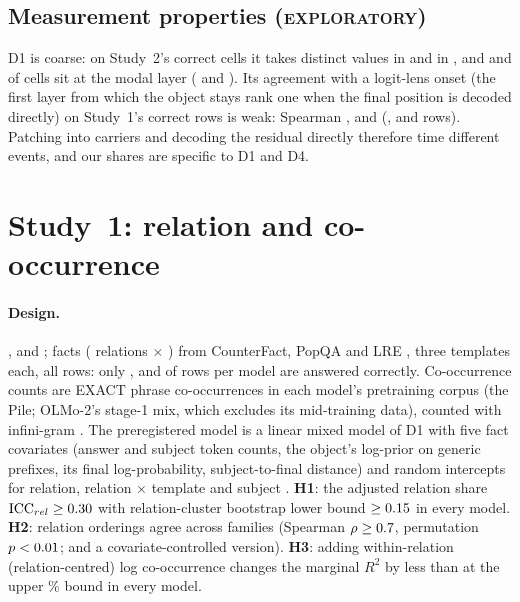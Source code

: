 \documentclass[11pt]{article}
\newcommand{\Rsq}{\ensuremath{R^{2}}\xspace} %
\newcommand{\expl}{\textsc{exploratory}\xspace}
\newcommand{\olmo}{\OlmoTwoSevenB}
\newcommand{\llama}{\LlamaThreeOneEightB}
\newcommand{\SOne}{Study~1\xspace} %
\newcommand{\STwo}{Study~2\xspace} %
\begin{document}
\subsection{Measurement properties (\expl)}
\label{sec:props}
D1 is coarse: on \STwo's correct cells it takes \explNDistinctLlama{} distinct values in \llama{} and \explNDistinctOlmo{} in \olmo, and \explModalShareLlama{} and \explModalShareOlmo{} of cells sit at the modal layer (\explModalLayerLlama{} and \explModalLayerOlmo).
Its agreement with a logit-lens onset (the first layer from which the object stays rank one when the final position is decoded directly) on \SOne's correct rows is weak: Spearman \explHrLensRhoPyOneFour, \explHrLensRhoPyTwoEight{} and \explHrLensRhoOlmoSeven{} (\explHrLensNPyOneFour, \explHrLensNPyTwoEight{} and \explHrLensNOlmoSeven{} rows).
Patching into carriers and decoding the residual directly therefore time different events, and our shares are specific to D1 and D4.

\section{\SOne: relation and co-occurrence}
\label{sec:hr}
\paragraph{Design.}
\PythiaOneFourB, \PythiaTwoEightB{} \citep{biderman2023pythia} and \olmo{} \citep{olmo2025two}; \hrNFacts{} facts (\hrNRelations{} relations $\times$ \hrNPerRelation) from CounterFact, PopQA and LRE \citep{meng2022rome,mallen2023popqa,hernandez2024linearity}, three templates each, all rows: only \hrNCorrectPyOneFour, \hrNCorrectPyTwoEight{} and \hrNCorrectOlmoSeven{} of \hrNPyOneFour{} rows per model are answered correctly.
Co-occurrence counts are EXACT phrase co-occurrences in each model's pretraining corpus (the Pile; OLMo-2's stage-1 mix, which excludes its mid-training data), counted with infini-gram \citep{liu2024infinigram}.
The preregistered model is a linear mixed model of D1 with five fact covariates (answer and subject token counts, the object's log-prior on generic prefixes, its final log-probability, subject-to-final distance) and random intercepts for relation, relation $\times$ template and subject \citep{bates2015lme4}.
\textbf{H1}: the adjusted relation share $\mathrm{ICC}_{rel} \ge 0.30$ with relation-cluster bootstrap lower bound $\ge 0.15$ in every model.
\textbf{H2}: relation orderings agree across families (Spearman $\rho \ge 0.7$, permutation $p<0.01$; and a covariate-controlled version).
\textbf{H3}: adding within-relation (relation-centred) log co-occurrence changes the marginal \Rsq \citep{nakagawa2013r2} by less than \hrThrDRsqHi{} at the upper \ptCiLevel\% bound in every model.
\end{document}

